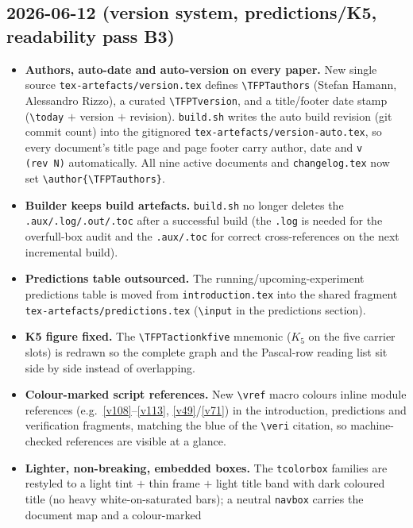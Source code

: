 \subsection*{2026-06-12 (version system, predictions/K5, readability pass B3)}
\begin{itemize}
\item \textbf{Authors, auto-date and auto-version on every paper.} New single source
  \texttt{tex-artefacts/version.tex} defines \texttt{\textbackslash TFPTauthors} (Stefan Hamann,
  Alessandro Rizzo), a curated \texttt{\textbackslash TFPTversion}, and a title/footer date stamp
  (\texttt{\textbackslash today} $+$ version $+$ revision). \texttt{build.sh} writes the auto build
  revision (git commit count) into the gitignored \texttt{tex-artefacts/version-auto.tex}, so every
  document's title page and page footer carry author, date and \texttt{v\TFPTversion\,(rev~N)}
  automatically. All nine active documents and \texttt{changelog.tex} now set
  \texttt{\textbackslash author\{\textbackslash TFPTauthors\}}.
\item \textbf{Builder keeps build artefacts.} \texttt{build.sh} no longer deletes the
  \texttt{.aux/.log/.out/.toc} after a successful build (the \texttt{.log} is needed for the
  overfull-box audit and the \texttt{.aux/.toc} for correct cross-references on the next incremental
  build).
\item \textbf{Predictions table outsourced.} The running/upcoming-experiment predictions table is moved
  from \texttt{introduction.tex} into the shared fragment \texttt{tex-artefacts/predictions.tex}
  (\texttt{\textbackslash input} in the predictions section).
\item \textbf{K5 figure fixed.} The \texttt{\textbackslash TFPTactionkfive} mnemonic ($K_5$ on the five
  carrier slots) is redrawn so the complete graph and the Pascal-row reading list sit side by side
  instead of overlapping.
\item \textbf{Colour-marked script references.} New \texttt{\textbackslash vref} macro colours inline
  module references (e.g.\ \vref{v108}--\vref{v113}, \vref{v49}/\vref{v71}) in the introduction,
  predictions and verification fragments, matching the blue of the \texttt{\textbackslash veri}
  citation, so machine-checked references are visible at a glance.
\item \textbf{Lighter, non-breaking, embedded boxes.} The \texttt{tcolorbox} families are restyled to a
  light tint $+$ thin frame $+$ light title band with dark coloured title (no heavy
  white-on-saturated bars); a neutral \texttt{navbox} carries the document map and a colour-marked

\end{itemize}
